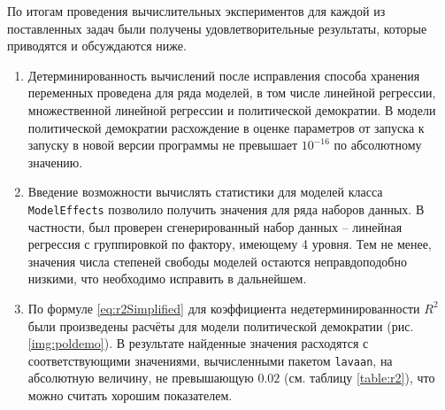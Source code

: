 По итогам проведения вычислительных экспериментов для каждой из поставленных задач были получены удовлетворительные результаты, которые приводятся и обсуждаются ниже.

\begin{enumerate}
	\item Детерминированность вычислений после исправления способа хранения переменных проведена для ряда моделей, в том числе линейной регрессии, множественной линейной регрессии и политической демократии.
	В модели политической демократии расхождение в оценке параметров от запуска к запуску в новой версии программы не превышает $ 10^{-16} $ по абсолютному значению.
	
	\item Введение возможности вычислять статистики для моделей класса \texttt{Model\-Effects} позволило получить значения для ряда наборов данных.
	В частности, был проверен сгенерированный набор данных -- линейная регрессия с группировкой по фактору, имеющему 4 уровня.
	Тем не менее, значения числа степеней свободы моделей остаются неправдоподобно низкими, что необходимо исправить в дальнейшем.
	
	\item По формуле \eqref{eq:r2Simplified} для коэффициента недетерминированности $ R^2 $ были произведены расчёты для модели политической демократии (рис. \ref{img:poldemo}).
	В результате найденные значения расходятся с соответствующими значениями, вычисленными пакетом \texttt{lavaan}, на абсолютную величину, не превышающую $ 0.02 $ (см. таблицу \ref{table:r2}), что можно считать хорошим показателем.
\end{enumerate}
